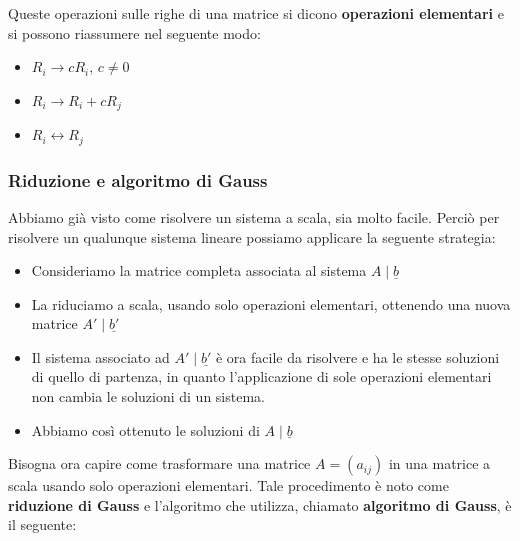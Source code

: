 \documentclass[
  a4paper,
]{article}
\providecommand{\tightlist}{%
  \setlength{\itemsep}{0pt}\setlength{\parskip}{0pt}}
\providecommand{\tightlist}{}
\begin{document}
\begin{definitionbox}
Queste operazioni sulle righe di una matrice si dicono
\textbf{operazioni elementari} e si possono riassumere nel seguente
modo:

\begin{itemize}
\tightlist
\item
  \(R_i \to cR_i\), \(c \not = 0\)
\item
  \(R_i \to R_i + cR_j\)
\item
  \(R_i \leftrightarrow R_j\)
\end{itemize}
\end{definitionbox}

\hypertarget{riduzione-e-algoritmo-di-gauss}{%
\subsubsection{Riduzione e algoritmo di
Gauss}\label{riduzione-e-algoritmo-di-gauss}}

Abbiamo già visto come risolvere un sistema a scala, sia molto facile.
Perciò per risolvere un qualunque sistema lineare possiamo applicare la
seguente strategia:

\begin{itemize}
\tightlist
\item
  Consideriamo la matrice completa associata al sistema
  \(A\mid \underline{b}\)
\item
  La riduciamo a scala, usando solo operazioni elementari, ottenendo una
  nuova matrice \(A'\mid \underline{b'}\)
\item
  Il sistema associato ad \(A'\mid \underline{b'}\) è ora facile da
  risolvere e ha le stesse soluzioni di quello di partenza, in quanto
  l'applicazione di sole operazioni elementari non cambia le soluzioni
  di un sistema.
\item
  Abbiamo così ottenuto le soluzioni di \(A\mid \underline{b}\)
\end{itemize}

Bisogna ora capire come trasformare una matrice \(A=(a_{ij})\) in una
matrice a scala usando solo operazioni elementari. Tale procedimento è
noto come \textbf{riduzione di Gauss} e l'algoritmo che utilizza,
chiamato \textbf{algoritmo di Gauss}, è il seguente:
\end{document}
